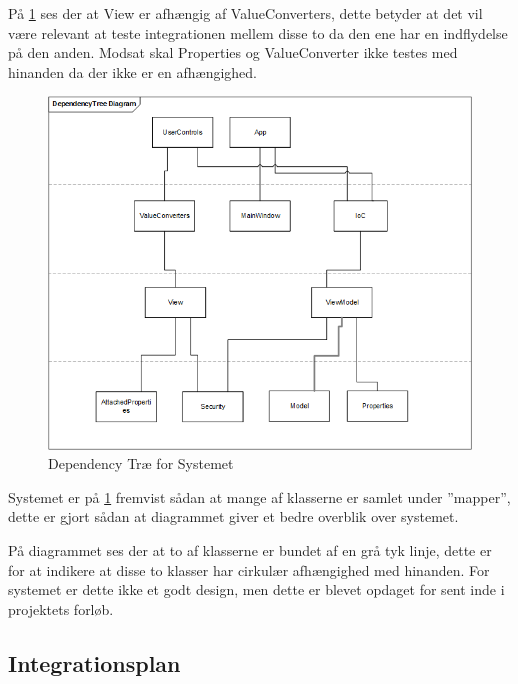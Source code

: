 \documentclass[a4paper,12pt,fleqn,oneside]{article}
\begin{document}
På \ref{fig:CarnGo_Dependency Tree} ses der at View er afhængig af ValueConverters, dette betyder at det vil være relevant at teste integrationen mellem disse to da den ene har en indflydelse på den anden. Modsat skal Properties og ValueConverter ikke testes med hinanden da der ikke er en afhængighed. 

\begin{figure}[H]
    \centering
    \includegraphics[width=\textwidth]{Rapport/Tests/DepedencyDiagramV2.png}
    \caption{Dependency Træ for Systemet}
    \label{fig:CarnGo_Dependency Tree}
\end{figure}

Systemet er på \ref{fig:CarnGo_Dependency Tree} fremvist sådan at mange af klasserne er samlet under ”mapper”, dette er gjort sådan at diagrammet giver et bedre overblik over systemet. 

På diagrammet ses der at to af klasserne er bundet af en grå tyk linje, dette er for at indikere at disse to klasser har cirkulær afhængighed med hinanden. For systemet er dette ikke et godt design, men dette er blevet opdaget for sent inde i projektets forløb. 


\subsection{Integrationsplan}

\printbibliography
\end{document}
